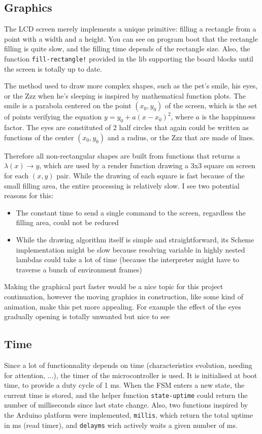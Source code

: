 \documentclass[a4paper]{article}
\begin{document}
\subsection{Graphics}
The LCD screen merely implements a unique primitive: filling a rectangle from a point with a width and a height. You can see on program boot that the rectangle filling is quite slow, and the filling time depends of the rectangle size. Also, the function \texttt{fill-rectangle!} provided in the lib supporting the board blocks until the screen is totally up to date. 

The method used to draw more complex shapes, such as the pet's smile, his eyes, or the Zzz when he's sleeping is inspired by mathematical function plots. The smile is a parabola centered on the point $(x_0, y_0)$ of the screen, which is the set of points verifying the equation $y = y_0 + a(x - x_0)^2 $, where $a$ is the happinness factor. The eyes are constituted of 2 half circles that again could be written as functions of the center $(x_0, y_0)$ and a radius, or the Zzz that are made of lines.

Therefore all non-rectangular shapes are built from functions that returns a $\lambda(x) \rightarrow y$, which are used by a render function drawing a 3x3 square on screen for each $(x, y)$ pair. While the drawing of each square is fast because of the small filling area, the entire processing is relatively slow. I see two potential reasons for this: 
\begin{itemize}
  \item The constant time to send a single command to the screen, regardless the filling area, could not be reduced
  \item While the drawing algorithm itself is simple and straightforward, its Scheme implementation might be slow because resolving variable in highly nested lambdas could take a lot of time (because the interpreter might have to traverse a bunch of environment frames)
\end{itemize}

Making the graphical part faster would be a nice topic for this project continuation, however the moving graphics in construction, like some kind of animation, make this pet more appealing. For example the effect of the eyes gradually opening is totally unwanted but nice to see

\subsection{Time}
\label{time}
Since a lot of functionnality depends on time (characteristics evolution, needing for attention, ...), the timer of the microcontroller is used. It is initialised at boot time, to provide a duty cycle of 1 ms. When the FSM enters a new state, the current time is stored, and the helper function \texttt{state-uptime} could return the number of milliseconds since last state change. Also, two functions inspired by the Arduino platform were implemented, \texttt{millis}, which return the total uptime in ms (read timer), and \texttt{delayms} wich actively waits a given number of ms. 
\end{document}
